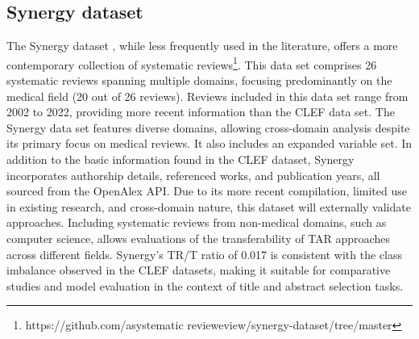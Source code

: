 \documentclass[10pt,oneside]{book}
\begin{document}
\subsection{Synergy dataset}
The Synergy dataset \cite{de_bruin_synergy_2023}, while less frequently used in the literature, offers a more contemporary collection of systematic reviews\footnote{https://github.com/asystematic revieweview/synergy-dataset/tree/master}. This data set comprises 26 systematic reviews spanning multiple domains, focusing predominantly on the medical field (20 out of 26 reviews). Reviews included in this data set range from 2002 to 2022, providing more recent information than the CLEF data set.
The Synergy data set features diverse domains, allowing cross-domain analysis despite its primary focus on medical reviews. It also includes an expanded variable set. In addition to the basic information found in the CLEF dataset, Synergy incorporates authorship details, referenced works, and publication years, all sourced from the OpenAlex API.
Due to its more recent compilation, limited use in existing research, and cross-domain nature, this dataset will externally validate approaches. Including systematic reviews from non-medical domains, such as computer science, allows evaluations of the transferability of TAR approaches across different fields. Synergy's TR/T ratio of 0.017 is consistent with the class imbalance observed in the CLEF datasets, making it suitable for comparative studies and model evaluation in the context of title and abstract selection tasks.


\end{document}
